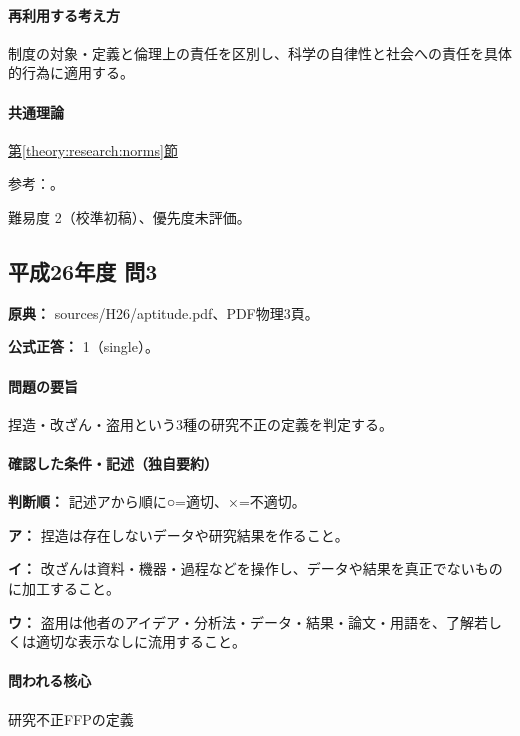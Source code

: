 \paragraph{再利用する考え方} 制度の対象・定義と倫理上の責任を区別し、科学の自律性と社会への責任を具体的行為に適用する。

\paragraph{共通理論} \hyperref[theory:research:norms]{第\ref*{theory:research:norms}節}

\par 参考：\cite{scj_code2013}。

\par 難易度 2（校準初稿）、優先度未評価。

\subsection{平成26年度 問3}
\label{q:h26-reg-apt-03}

\noindent\textbf{原典：} sources/H26/aptitude.pdf、PDF物理3頁。

\textbf{公式正答：} 1（single）。

\paragraph{問題の要旨} 捏造・改ざん・盗用という3種の研究不正の定義を判定する。

\paragraph{確認した条件・記述（独自要約）}\mbox{}\par

\noindent\textbf{判断順：} 記述アから順に○=適切、×=不適切。\par

\noindent\textbf{ア：} 捏造は存在しないデータや研究結果を作ること。\par

\noindent\textbf{イ：} 改ざんは資料・機器・過程などを操作し、データや結果を真正でないものに加工すること。\par

\noindent\textbf{ウ：} 盗用は他者のアイデア・分析法・データ・結果・論文・用語を、了解若しくは適切な表示なしに流用すること。\par

\paragraph{問われる核心} 研究不正FFPの定義

